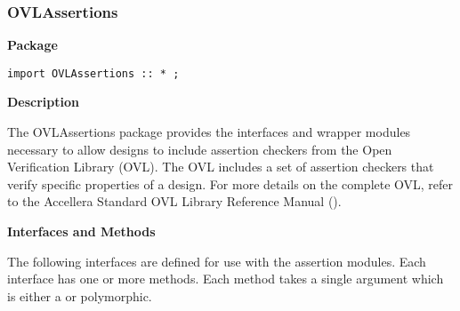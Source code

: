 \subsubsection{OVLAssertions}


{\bf Package}

\begin{verbatim}
import OVLAssertions :: * ;
\end{verbatim}



{\bf Description}

The OVLAssertions package provides the {\BSV} interfaces and wrapper
modules necessary to allow {\BSV} designs to include assertion
checkers from the Open Verification Library (OVL).  The OVL includes a
set of assertion checkers that verify specific properties of a design.
For more details on the complete OVL, refer to the Accellera Standard
OVL Library Reference Manual ().



{\bf Interfaces and Methods}


The following interfaces are defined for use with the assertion
modules.  Each interface has one or more  methods.  Each
method takes a single argument which is either a  or
polymorphic.   


